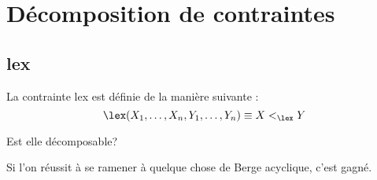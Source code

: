 \documentclass[a4paper,11pt]{thesis}
\begin{document}
\section{Décomposition de contraintes}

\subsection{lex}

La contrainte lex est définie de la manière suivante :
\begin{displaymath}
    \lex(X_1, \dots, X_n, Y_1, \dots, Y_n) \equiv X <_{\lex} Y
\end{displaymath}

Est elle décomposable?

Si l'on réussit à se ramener à quelque chose de Berge acyclique, c'est gagné.

    
\end{document}
